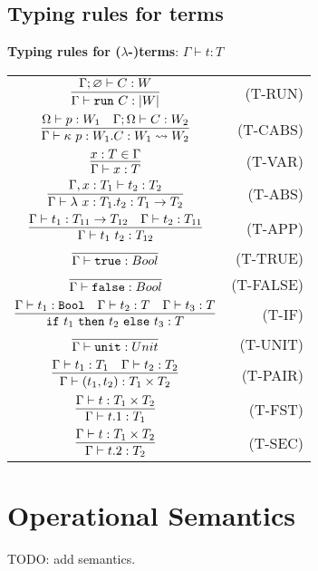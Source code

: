 \documentclass[12pt]{article}
\begin{document}
\subsection{Typing rules for terms}
\noindent \textbf{Typing rules for ($\lambda$-)terms}: $\boxed{\Gamma\vdash t:T}$

\renewcommand\arraystretch{3}
\begin{longtable}[c]{cr}
  $\infer{\Gamma\vdash \trun\ C : |W| }{\Gamma;\varnothing \vdash C:W}$ &(T-RUN)\\
  $\infer{\Gamma\vdash \kappa\ p:W_1 . C: W_1\leadsto W_2 }{\Omega\vdash p:W_1 &\Gamma;\Omega\vdash C:W_2}$ &(T-CABS)\\
  $\infer{\Gamma\vdash x:T}{x:T\in \Gamma}$ &(T-VAR)\\
  $\infer{\Gamma\vdash \lambda\ x:T_1.t_2 : T_1\to T_2}{\Gamma,x:T_1 \vdash t_2:T_2}$ &(T-ABS)\\
  $\infer{\Gamma\vdash t_1\ t_2 : T_{12}}{\Gamma\vdash t_1:T_{11}\to T_{12} & \Gamma\vdash t_2:T_{11}}$ &(T-APP)\\
  $\infer{\Gamma\vdash\true : Bool}{}$ &(T-TRUE)\\
  $\infer{\Gamma\vdash\false : Bool}{}$ &(T-FALSE)\\
  $\infer{\tif\ t_1\ \tthen\ t_2\ \telse\ t_3 : T}{\Gamma\vdash t_1:\Bool &\Gamma\vdash t_2:T &\Gamma\vdash t_3:T}$ &(T-IF)\\
  $\infer{\Gamma\vdash\unit : Unit}{}$ &(T-UNIT)\\
  $\infer{\Gamma\vdash (t_1,t_2) : T_1\times T_2}{\Gamma\vdash t_1:T_1 &\Gamma\vdash t_2:T_2}$ &(T-PAIR)\\
  $\infer{\Gamma\vdash t.1 : T_1}{\Gamma\vdash t : T_1\times T_2}$ &(T-FST)\\
  $\infer{\Gamma\vdash t.2 : T_2}{\Gamma\vdash t : T_1\times T_2}$ &(T-SEC)\\
\end{longtable}


\section{Operational Semantics}
{\color{red} TODO: add semantics.}
\end{document}
